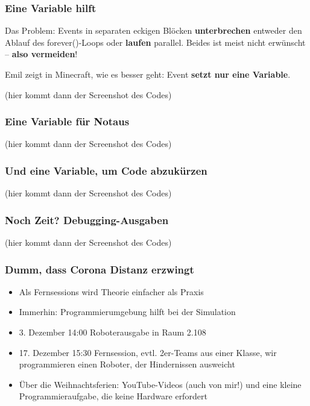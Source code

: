 \documentclass{beamer}
\begin{document}
\begin{frame}
\frametitle{Eine Variable hilft}
Das Problem: Events in separaten eckigen Blöcken \textbf{unterbrechen} entweder den Ablauf des forever()-Loops oder \textbf{laufen} parallel. Beides ist meist nicht erwünscht – \textbf{also vermeiden}! 

Emil zeigt in Minecraft, wie es besser geht: Event \textbf{setzt nur eine Variable}.

(hier kommt dann der Screenshot des Codes)

\end{frame}
 

\begin{frame}
\frametitle{Eine Variable für Notaus}
(hier kommt dann der Screenshot des Codes)
\end{frame}

\begin{frame}
\frametitle{Und eine Variable, um Code abzukürzen}
(hier kommt dann der Screenshot des Codes)
\end{frame}

\begin{frame}
\frametitle{Noch Zeit? Debugging-Ausgaben}
(hier kommt dann der Screenshot des Codes)
\end{frame}

\begin{frame}
\frametitle{Dumm, dass Corona Distanz erzwingt}
\begin{itemize}
\item Als Fernsessions wird Theorie einfacher als Praxis
\item Immerhin: Programmierumgebung hilft bei der Simulation
\item 3. Dezember 14:00 Roboterausgabe in Raum 2.108
\item 17. Dezember 15:30 Fernsession, evtl. 2er-Teams aus einer Klasse, wir programmieren einen Roboter, der Hindernissen ausweicht
\item Über die Weihnachtsferien: YouTube-Videos (auch von mir!) und eine kleine Programmieraufgabe, die keine Hardware erfordert
\end{itemize}



\end{frame}
\end{document}
